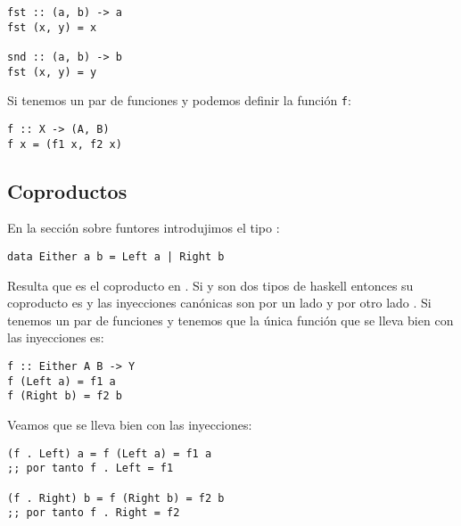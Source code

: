 \begin{verbatim}
fst :: (a, b) -> a
fst (x, y) = x

snd :: (a, b) -> b
fst (x, y) = y
\end{verbatim}

Si tenemos un par de funciones  y
 podemos definir la función \texttt{f}:
\begin{verbatim}
f :: X -> (A, B)
f x = (f1 x, f2 x)
\end{verbatim}

\subsection{Coproductos}
En la sección sobre funtores introdujimos el tipo :
\begin{verbatim}
data Either a b = Left a | Right b
\end{verbatim}
Resulta que  es el coproducto en . Si
 y  son dos tipos de haskell entonces su coproducto
es  y las inyecciones canónicas son por un lado
 y por otro lado
. Si tenemos un par de funciones
 y  tenemos que la única
función  que se lleva bien con las inyecciones
es:
\begin{verbatim}
f :: Either A B -> Y
f (Left a) = f1 a
f (Right b) = f2 b
\end{verbatim}

Veamos que se lleva bien con las inyecciones:
\begin{verbatim}
(f . Left) a = f (Left a) = f1 a
;; por tanto f . Left = f1

(f . Right) b = f (Right b) = f2 b
;; por tanto f . Right = f2
\end{verbatim}
